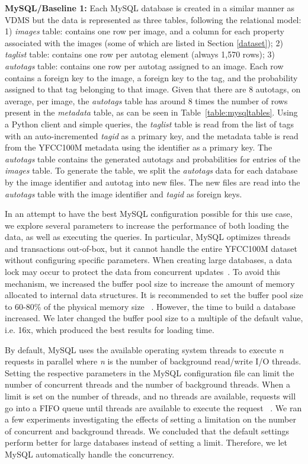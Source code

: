 \textbf{MySQL/Baseline 1:}
Each MySQL database is created in a similar manner as VDMS
but the data is represented as three tables, following the relational model:
1) \textit{images} table: contains one row per image,
and a column for each property
associated with the images (some of which are listed in Section \ref{dataset});
2) \textit{taglist} table: contains one row per autotag element
(always 1,570 rows);
3) \textit{autotags} table: contains one row per autotag
assigned to an image. Each row contains a foreign key to the
image, a foreign key to the tag, and
the probability assigned to that tag belonging to that image.
Given that there are 8 autotags, on average, per image, the \textit{autotags}
table has around 8 times the number of rows present in the
\textit{metadata} table, as can be seen in Table~\ref{table:mysqltables}.
Using a Python client and simple queries, the \textit{taglist}
table is read from the list of tags with an auto-incremented
\textit{tagid} as a primary key, and the metadata table
is read from the YFCC100M metadata using the identifier as a primary key.
The \textit{autotags} table contains the generated autotags and
probabilities for entries of the \textit{images} table.
To generate the table, we split the \textit{autotags} data for each database
by the image identifier and autotag into new files.
The new files are read into the \textit{autotags} table with the image
identifier and \textit{tagid} as foreign keys.

In an attempt to have the best MySQL configuration possible for this use case,
we explore several parameters to increase the performance
of both loading the data, as well as executing the queries.
In particular, MySQL optimizes threads and transactions out-of-box,
but it cannot handle the entire YFCC100M dataset without configuring
specific parameters.
When creating large databases, a data lock may occur to protect the
data from concurrent updates~\cite{mysql_blog}.
To avoid this mechanism, we increased the buffer pool size to
increase the amount of memory allocated to internal data structures.
It is recommended to set the buffer pool size to 60-80\% of the physical
memory size ~\cite{mysql,mysql_blog}.
However, the time to build a database increased.
We later changed  the buffer pool size to a multiple of the default value, i.e. 16x,
which produced the best results for loading time.

By default, MySQL uses the available operating system threads to
execute \textit{n} requests in parallel where \textit{n} is
the number of background read/write I/O threads.
Setting the respective parameters in the MySQL configuration file can limit the
number of concurrent threads and the number of background threads.
When a limit is set on the number of threads, and no threads are available,
requests will go into a FIFO queue until threads are available to execute
the request ~\cite{mysql,mysql_blog}.
We ran a few experiments investigating the effects of setting a limitation on the
number of concurrent and background threads.
We concluded that the default settings perform better for large databases instead of
setting a limit.
Therefore, we let MySQL automatically handle the concurrency.

